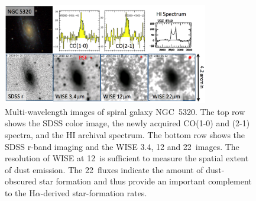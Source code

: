 \documentclass[11pt, preprint]{aastex}
\newcommand{\ha}{H$\alpha$}
\newcommand{\sers}{{\it S\'{e}rsic}}
\begin{document}
{\begin{figure}[h]
\centering
\includegraphics[width=0.8\textwidth]{NGC5320multiwaveV2.png}
\caption{\small 
Multi-wavelength images of spiral galaxy NGC~5320.  The top row shows
the SDSS color image, the newly acquired CO(1-0) and (2-1) spectra,
and the HI archival spectrum.  The bottom row shows the SDSS r-band
imaging and the WISE 3.4, 12 and 22\micron \ images. The resolution of WISE at 12\micron\ is
sufficient to measure the spatial extent of dust emission.  The 22\micron \ fluxes indicate the amount of
dust-obscured star formation and thus provide an important complement
to the \ha-derived star-formation rates.
}
\label{wiseCO}
\vspace{-0.5cm}
\end{figure}




}
\end{document}
